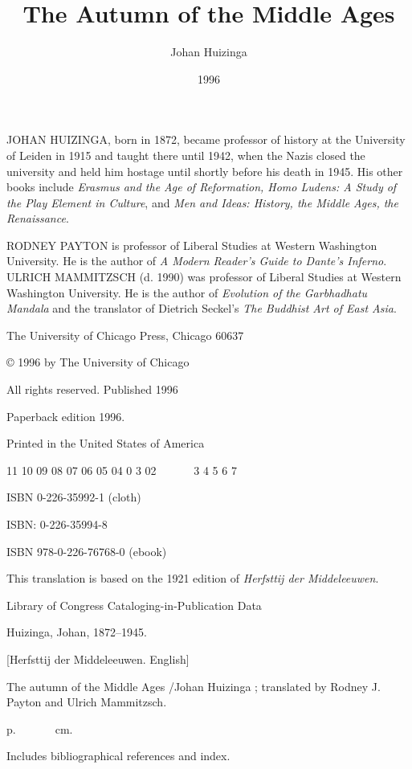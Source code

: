 \documentclass[
]{book}
\title{The Autumn of the Middle Ages}
\author{Johan Huizinga}
\date{1996}
\begin{document}
\maketitle
{}

\protect\hypertarget{00_Cover.xhtml}{}{}

\protect\hypertarget{02_Copyright.xhtml}{}{}

\protect\hypertarget{02_Copyright.xhtmlux5cux23page_iv}{}{}JOHAN
HUIZINGA, born in 1872, became professor of history at the University of
Leiden in 1915 and taught there until 1942, when the Nazis closed the
university and held him hostage until shortly before his death in 1945.
His other books include \emph{Erasmus and the Age of Reformation, Homo
Ludens: A Study of the Play Element in Culture}, and \emph{Men and
Ideas: History, the Middle Ages, the Renaissance}.

RODNEY PAYTON is professor of Liberal Studies at Western Washington
University. He is the author of \emph{A Modern Reader's Guide to Dante's
Inferno}. ULRICH MAMMITZSCH (d. 1990) was professor of Liberal Studies
at Western Washington University. He is the author of \emph{Evolution of
the Garbhadhatu Mandala} and the translator of Dietrich Seckel's
\emph{The Buddhist Art of East Asia}.

The University of Chicago Press, Chicago 60637

© 1996 by The University of Chicago

All rights reserved. Published 1996

Paperback edition 1996.

Printed in the United States of America

11 10 09 08 07 06 05 04 0 3 02~~~~~~ 3 4 5 6 7

ISBN 0-226-35992-1 (cloth)

ISBN: 0-226-35994-8

ISBN 978-0-226-76768-0 (ebook)

This translation is based on the 1921 edition of \emph{Herfsttij der
Middeleeuwen}.

Library of Congress Cataloging-in-Publication Data

Huizinga, Johan, 1872--1945.

{[}Herfsttij der Middeleeuwen. English{]}

The autumn of the Middle Ages /Johan Huizinga ; translated by Rodney J.
Payton and Ulrich Mammitzsch.

p.~~~~~~~cm.

Includes bibliographical references and index.
\end{document}
